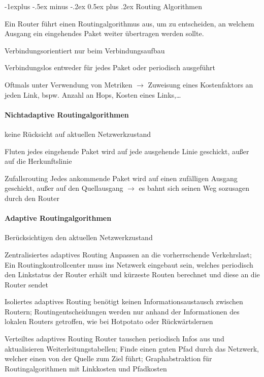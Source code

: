 \documentclass[10pt,landscape]{article}
\makeatletter
\renewcommand{\subsection}{\@startsection{subsection}{2}{0mm}%
                                {-1explus -.5ex minus -.2ex}%
                                {0.5ex plus .2ex}%
                                {\normalfont\normalsize\bfseries}}
\makeatother
\begin{document}
\begin{multicols}{3}
    \subsection{Routing Algorithmen}
    \begin{itemize*}
        \item Ein Router führt einen Routingalgorithmus aus, um zu entscheiden, an welchem Ausgang ein eingehendes Paket weiter übertragen werden sollte.
        \begin{description*}
            \item[Verbindungsorientiert] nur beim Verbindungsaufbau
            \item[Verbindungslos] entweder für jedes Paket oder periodisch ausgeführt
        \end{description*}
        \item Oftmals unter Verwendung von Metriken $\rightarrow$ Zuweisung eines Kostenfaktors an jeden Link, bspw. Anzahl an Hops, Kosten eines Links,…
    \end{itemize*}
    \paragraph{Nichtadaptive Routingalgorithmen}
    \begin{description*}
        \item[] keine Rücksicht auf aktuellen Netzwerkzustand
        \item[Fluten] jedes eingehende Paket wird auf jede ausgehende Linie geschickt, außer auf die Herkunftslinie
        \item[Zufallsrouting] Jedes ankommende Paket wird auf einen zufälligen Ausgang geschickt, außer auf den Quellausgang $\rightarrow$ es bahnt sich seinen Weg sozusagen durch den Router
    \end{description*}
    \paragraph{Adaptive Routingalgorithmen}
    \begin{description*}
        \item[] Berücksichtigen den aktuellen Netzwerkzustand
        \item[Zentralisiertes adaptives Routing] Anpassen an die vorherrschende Verkehrslast; Ein Routingkontrollcenter muss ins Netzwerk eingebaut sein, welches periodisch den Linkstatus der Router erhält und kürzeste Routen berechnet und diese an die Router sendet
        \item[Isoliertes adaptives Routing] benötigt keinen Informationsaustausch zwischen Routern; Routingentscheidungen werden nur anhand der Informationen des lokalen Routers getroffen, wie bei Hotpotato oder Rückwärtslernen
        \item[Verteiltes adaptives Routing] Router tauschen periodisch Infos aus und aktualisieren Weiterleitungstabellen; Finde einen guten Pfad durch das Netzwerk, welcher einen von der Quelle zum Ziel führt; Graphabstraktion für Routingalgorithmen mit Linkkosten und Pfadkosten
    \end{description*}
    

\end{multicols}
\end{document}
